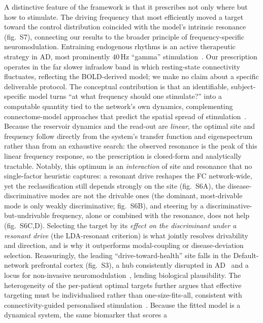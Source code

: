 \documentclass[11pt]{article}
\begin{document}
A distinctive feature of the framework is that it prescribes not only where but
how to stimulate. The driving frequency that most efficiently moved a target
toward the control distribution coincided with the model's intrinsic resonance
(fig.~S7), connecting our results to the broader principle of
frequency-specific neuromodulation. Entraining endogenous rhythms is an active therapeutic strategy in AD, most prominently $40$\,Hz ``gamma'' stimulation~\cite{iaccarino2016,martorell2019}. Our prescription operates in the far slower infraslow band in which resting-state connectivity fluctuates, reflecting the BOLD-derived model; we make no claim about a specific deliverable protocol. The conceptual contribution is that an identifiable,
subject-specific model turns ``at what frequency should one stimulate?'' into a
computable quantity tied to the network's own dynamics, complementing
connectome-model approaches that predict the spatial spread of
stimulation~\cite{spiegler2016,kunze2016}. Because the reservoir dynamics and the read-out are \emph{linear}, the optimal site and frequency follow directly from the system's transfer function and eigenspectrum rather than from an exhaustive search: the observed resonance is the peak of this linear frequency response, so the prescription is closed-form and analytically tractable. Notably, this optimum is
an \emph{interaction} of site and resonance that no single-factor heuristic
captures: a resonant drive reshapes the FC network-wide, yet the reclassification
still depends strongly on the site (fig.~S6A), the disease-discriminative modes are
not the drivable ones (the dominant, most-drivable mode is only weakly
discriminative; fig.~S6B), and steering by a discriminative-but-undrivable
frequency, alone or combined with the resonance, does not help (fig.~S6C,D).
Selecting the target by its \emph{effect on the discriminant under a resonant
drive} (the LDA-resonant criterion) is what jointly resolves drivability and
direction, and is why it outperforms modal-coupling or disease-deviation selection.
Reassuringly, the leading ``drive-toward-health'' site falls in the Default-network prefrontal cortex (fig.~S3), a hub consistently disrupted in AD~\cite{greicius2004,sheline2013} and a locus for non-invasive neuromodulation~\cite{koch2022}, lending biological plausibility. The heterogeneity of the per-patient optimal targets further argues
that effective targeting must be individualised rather than one-size-fits-all,
consistent with connectivity-guided personalised stimulation~\cite{fox2014}.
Because the fitted model is a dynamical system, the same biomarker that scores a
\end{document}
